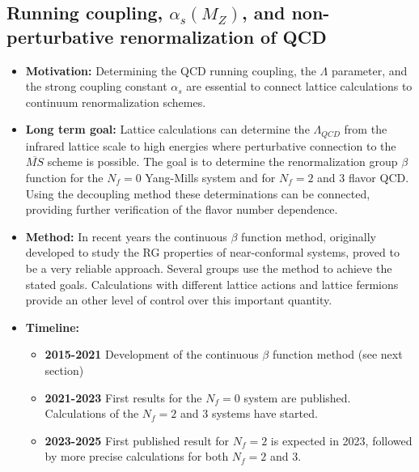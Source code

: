 \documentclass[12pt,hyperpdf]{article}
\begin{document}
\subsection{Running coupling, $\alpha_s(M_Z)$, and non-perturbative renormalization of QCD}
\begin{itemize}
   \item{\bf Motivation:} Determining the QCD running coupling, the
     $\Lambda$ parameter, and the strong coupling constant $\alpha_s$
     are essential to connect lattice calculations to continuum
     renormalization schemes.  
   \item{\bf Long term goal:} Lattice calculations can determine the
     $\Lambda_{QCD}$  from the infrared lattice scale to high energies
     where perturbative connection to the ${\overline {MS}}$ scheme is
     possible. The goal is to determine the renormalization group
     $\beta$ function for the $N_f=0$ Yang-Mills system and for
     $N_f=2$ and 3 flavor QCD. Using the decoupling method these
     determinations can be connected, providing further verification
     of the flavor number dependence. 
   \item{\bf Method:} In recent years the continuous $\beta$ function
     method, originally developed to study the RG properties of
     near-conformal systems, proved to be a very reliable
     approach. Several groups use the method to achieve the stated
     goals. Calculations with  different lattice actions and lattice
     fermions  provide an other level of control over this important
     quantity. 
\item{\bf Timeline:} 
\begin{itemize}
   \item{\bf 2015-2021} Development of the continuous $\beta$ function method (see next section)
   \item{\bf 2021-2023} First results for the $N_f=0$ system are published. Calculations of the $N_f=2$ and 3 systems have started. 
   \item{\bf 2023-2025} First published result for $N_f=2$ is expected in
     2023, followed by more precise calculations for both $N_f=2$ and 3. 
\end{itemize}   
\end{itemize}

\end{document}
